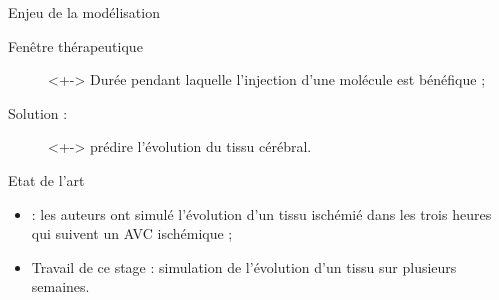\begin{frame}
\begin{block}{Enjeu de la mod\'elisation}
\begin{description}
\item[Fen\^etre th\'erapeutique]<+-> Dur\'ee pendant laquelle l'injection d'une mol\'ecule est b\'en\'efique ;
\item[Solution : ]<+-> pr\'edire l'\'evolution du tissu c\'er\'ebral.
\end{description}
\end{block}

\begin{block}{Etat de l'art}
\begin{itemize}
\item<+-> \cite{Duval_JCBFM_02} : les auteurs ont simul\'e l'\'evolution d'un tissu isch\'emi\'e dans les trois heures qui suivent un AVC isch\'emique ;
\item<+-> Travail de ce stage : simulation de l'\'evolution d'un tissu sur plusieurs semaines.
\end{itemize}
\end{block}
\end{frame}